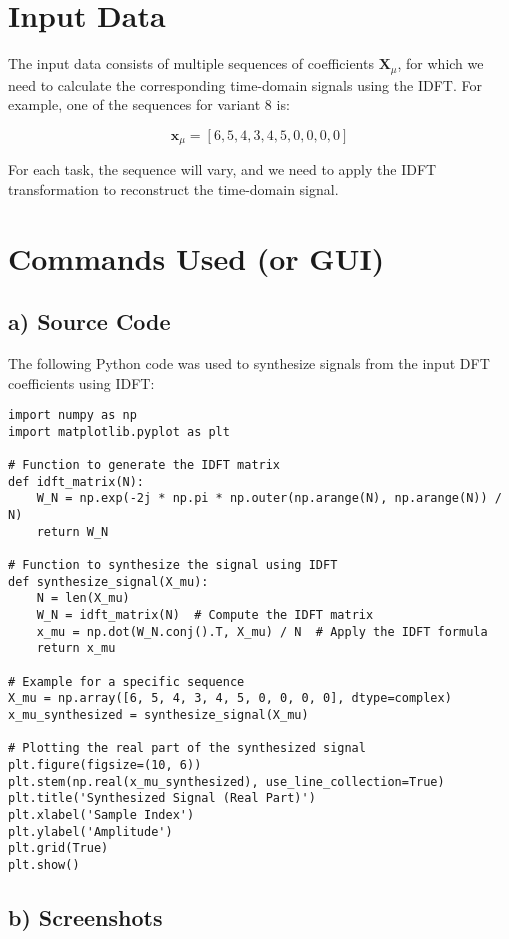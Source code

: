 \documentclass[12pt]{article}
\begin{document}
\section{Input Data}

The input data consists of multiple sequences of coefficients \( \mathbf{X}_\mu \), for which we need to calculate the corresponding time-domain signals using the IDFT. For example, one of the sequences for variant 8 is:

\[
\mathbf{x}_\mu = [6, 5, 4, 3, 4, 5, 0, 0, 0, 0]
\]

For each task, the sequence will vary, and we need to apply the IDFT transformation to reconstruct the time-domain signal.

\section{Commands Used (or GUI)}

\subsection{a) Source Code}

The following Python code was used to synthesize signals from the input DFT coefficients using IDFT:

\begin{verbatim}
import numpy as np
import matplotlib.pyplot as plt

# Function to generate the IDFT matrix
def idft_matrix(N):
    W_N = np.exp(-2j * np.pi * np.outer(np.arange(N), np.arange(N)) / N)
    return W_N

# Function to synthesize the signal using IDFT
def synthesize_signal(X_mu):
    N = len(X_mu)
    W_N = idft_matrix(N)  # Compute the IDFT matrix
    x_mu = np.dot(W_N.conj().T, X_mu) / N  # Apply the IDFT formula
    return x_mu

# Example for a specific sequence
X_mu = np.array([6, 5, 4, 3, 4, 5, 0, 0, 0, 0], dtype=complex)
x_mu_synthesized = synthesize_signal(X_mu)

# Plotting the real part of the synthesized signal
plt.figure(figsize=(10, 6))
plt.stem(np.real(x_mu_synthesized), use_line_collection=True)
plt.title('Synthesized Signal (Real Part)')
plt.xlabel('Sample Index')
plt.ylabel('Amplitude')
plt.grid(True)
plt.show()
\end{verbatim}

\subsection{b) Screenshots}
\end{document}
